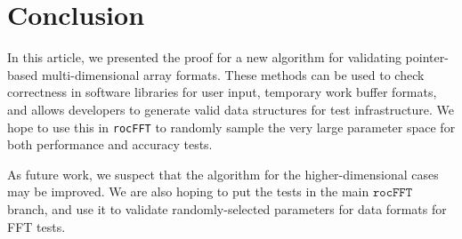 \documentclass[twocolumn,10pt,notitlepage]{article}
\begin{document}
\section{Conclusion}

In this article, we presented the proof for a new algorithm for
validating pointer-based multi-dimensional array formats.  These
methods can be used to check correctness in software libraries for
user input, temporary work buffer formats, and allows developers to
generate valid data structures for test infrastructure.  We hope to
use this in \texttt{rocFFT} to randomly sample the very large
parameter space for both performance and accuracy tests.

As future work, we suspect that the algorithm for the
higher-dimensional cases may be improved.  We are also hoping to put
the tests in the main $\texttt{rocFFT}$ branch, and use it to validate
randomly-selected parameters for data formats for FFT tests.
\end{document}
